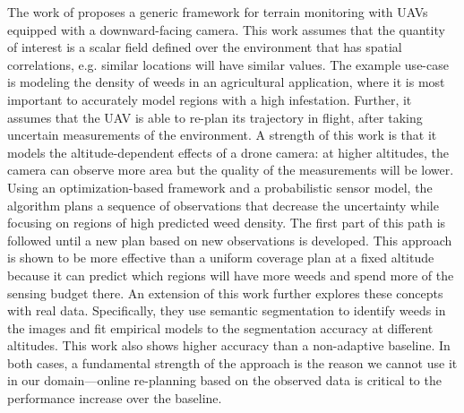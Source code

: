 The work of \cite{Popovic2020} proposes a generic framework for terrain monitoring with UAVs equipped with a downward-facing camera. This work assumes that the quantity of interest is a scalar field defined over the environment that has spatial correlations, e.g. similar locations will have similar values. The example use-case is modeling the density of weeds in an agricultural application, where it is most important to accurately model regions with a high infestation. Further, it assumes that the UAV is able to re-plan its trajectory in flight, after taking uncertain measurements of the environment. A strength of this work is that it models the altitude-dependent effects of a drone camera: at higher altitudes, the camera can observe more area but the quality of the measurements will be lower. Using an optimization-based framework and a probabilistic sensor model, the algorithm plans a sequence of observations that decrease the uncertainty while focusing on regions of high predicted weed density. The first part of this path is followed until a new plan based on new observations is developed. This approach is shown to be more effective than a uniform coverage plan at a fixed altitude because it can predict which regions will have more weeds and spend more of the sensing budget there. An extension of this work \cite{Stache2021AdaptiveSegmentation} further explores these concepts with real data. Specifically, they use semantic segmentation to identify weeds in the images and fit empirical models to the segmentation accuracy at different altitudes. This work also shows higher accuracy than a non-adaptive baseline. In both cases, a fundamental strength of the approach is the reason we cannot use it in our domain---online re-planning based on the observed data is critical to the performance increase over the baseline.

